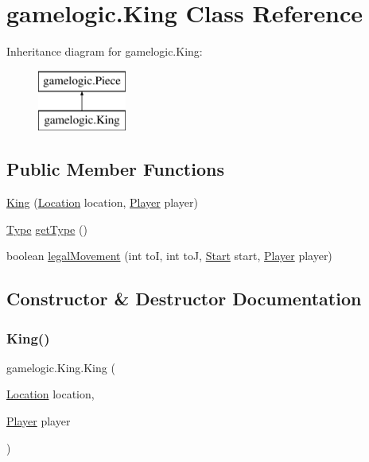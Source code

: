 \hypertarget{classgamelogic_1_1_king}{}\section{gamelogic.\+King Class Reference}
\label{classgamelogic_1_1_king}
Inheritance diagram for gamelogic.\+King\+:\begin{figure}[H]
\begin{center}
\leavevmode
\includegraphics[height=2.000000cm]{classgamelogic_1_1_king}
\end{center}
\end{figure}
\subsection*{Public Member Functions}
\begin{DoxyCompactItemize}
\item 
\mbox{\hyperlink{classgamelogic_1_1_king_a48e0937857b41ac6efc514220c0fdb2b}{King}} (\mbox{\hyperlink{classgamelogic_1_1_location}{Location}} location, \mbox{\hyperlink{classgamelogic_1_1_player}{Player}} player)
\item 
\mbox{\hyperlink{enumgamelogic_1_1_type}{Type}} \mbox{\hyperlink{classgamelogic_1_1_king_a664d6c675ccc53f2eb98bfbfa87eec74}{get\+Type}} ()
\item 
boolean \mbox{\hyperlink{classgamelogic_1_1_king_a4f7b56210475f032b8d6200aa925513a}{legal\+Movement}} (int toI, int toJ, \mbox{\hyperlink{classgamelogic_1_1_start}{Start}} start, \mbox{\hyperlink{classgamelogic_1_1_player}{Player}} player)
\end{DoxyCompactItemize}


\subsection{Constructor \& Destructor Documentation}
\mbox{\label{classgamelogic_1_1_king_a48e0937857b41ac6efc514220c0fdb2b}} 
\subsubsection{\texorpdfstring{King()}{King()}}
{\footnotesize\ttfamily gamelogic.\+King.\+King (\begin{DoxyParamCaption}\item[{\mbox{\hyperlink{classgamelogic_1_1_location}{Location}}}]{location,  }\item[{\mbox{\hyperlink{classgamelogic_1_1_player}{Player}}}]{player }\end{DoxyParamCaption})}

